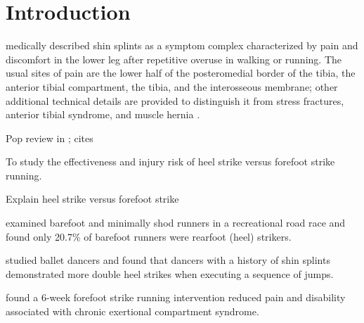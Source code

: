 \section{Introduction}


\citet{slocum1967shin} medically described shin splints as a symptom complex characterized by pain and discomfort in the lower leg after repetitive overuse in walking or running. The usual sites of pain are the lower half of the posteromedial border of the tibia, the anterior tibial compartment, the tibia, and the interosseous membrane; other additional technical details are provided to distinguish it from stress fractures, anterior tibial syndrome, and muscle hernia \citep{slocum1967shin}.

Pop review in \citep{douglas2012midfoot}; cites \citep{gandolini2012impact}

To study the effectiveness and injury risk of heel strike versus forefoot strike running.

Explain heel strike versus forefoot strike

\citet{larson2014comparison} examined barefoot and minimally shod runners in a recreational road race and found only 20.7\% of barefoot runners were rearfoot (heel) strikers. 

\citet{gans1985relationship} studied ballet dancers and found that dancers with a history of shin splints demonstrated more double heel strikes when executing a sequence of jumps. 

\citet{diebal2012forefoot} found a 6-week forefoot strike running intervention reduced pain and disability associated with chronic exertional compartment syndrome. 

